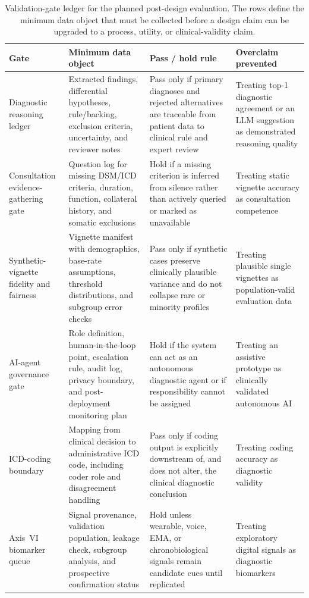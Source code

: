 \documentclass[11pt,a4paper]{article}
\begin{document}
\begin{table}[htbp]
\centering
\caption{Validation-gate ledger for the planned post-design evaluation. The rows define the minimum data object that must be collected before a design claim can be upgraded to a process, utility, or clinical-validity claim.}
\scriptsize
\renewcommand{\arraystretch}{1.15}
\begin{tabularx}{\textwidth}{@{}L{2.7cm}Y Y Y@{}}
\toprule
Gate & Minimum data object & Pass / hold rule & Overclaim prevented \\
\midrule
Diagnostic reasoning ledger & Extracted findings, differential hypotheses, rule/backing, exclusion criteria, uncertainty, and reviewer notes & Pass only if primary diagnoses and rejected alternatives are traceable from patient data to clinical rule and expert review & Treating top-1 diagnostic agreement or an LLM suggestion as demonstrated reasoning quality \\
Consultation evidence-gathering gate & Question log for missing DSM/ICD criteria, duration, function, collateral history, and somatic exclusions & Hold if a missing criterion is inferred from silence rather than actively queried or marked as unavailable & Treating static vignette accuracy as consultation competence \\
Synthetic-vignette fidelity and fairness & Vignette manifest with demographics, base-rate assumptions, threshold distributions, and subgroup error checks & Pass only if synthetic cases preserve clinically plausible variance and do not collapse rare or minority profiles & Treating plausible single vignettes as population-valid evaluation data \\
AI-agent governance gate & Role definition, human-in-the-loop point, escalation rule, audit log, privacy boundary, and post-deployment monitoring plan & Hold if the system can act as an autonomous diagnostic agent or if responsibility cannot be assigned & Treating an assistive prototype as clinically validated autonomous AI \\
ICD-coding boundary & Mapping from clinical decision to administrative ICD code, including coder role and disagreement handling & Pass only if coding output is explicitly downstream of, and does not alter, the clinical diagnostic conclusion & Treating coding accuracy as diagnostic validity \\
Axis~VI biomarker queue & Signal provenance, validation population, leakage check, subgroup analysis, and prospective confirmation status & Hold unless wearable, voice, EMA, or chronobiological signals remain candidate cues until replicated & Treating exploratory digital signals as diagnostic biomarkers \\
\bottomrule
\end{tabularx}
\label{tab:validation-gate-ledger}
\normalsize
\end{table}
\end{document}
